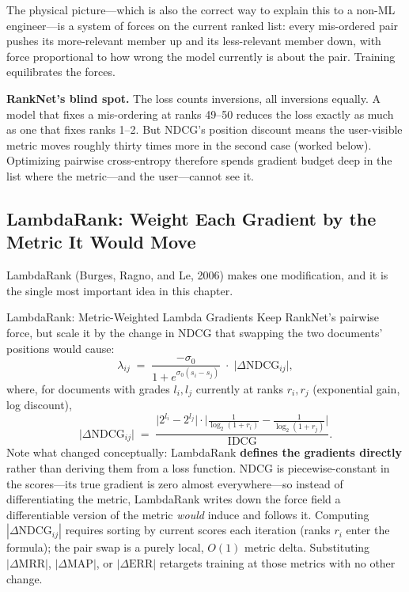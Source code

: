 The physical picture---which is also the correct way to explain this to a non-ML engineer---is a system of forces on the current ranked list: every mis-ordered pair pushes its more-relevant member up and its less-relevant member down, with force proportional to how wrong the model currently is about the pair. Training equilibrates the forces.

\textbf{RankNet's blind spot.} The loss counts inversions, all inversions equally. A model that fixes a mis-ordering at ranks 49--50 reduces the loss exactly as much as one that fixes ranks 1--2. But NDCG's position discount means the user-visible metric moves roughly thirty times more in the second case (worked below). Optimizing pairwise cross-entropy therefore spends gradient budget deep in the list where the metric---and the user---cannot see it.

\subsection{LambdaRank: Weight Each Gradient by the Metric It Would Move}

LambdaRank (Burges, Ragno, and Le, 2006) makes one modification, and it is the single most important idea in this chapter.

\begin{mathresult}{LambdaRank: Metric-Weighted Lambda Gradients}
Keep RankNet's pairwise force, but scale it by the change in NDCG that swapping the two documents' positions would cause:
\begin{equation}
\lambda_{ij} \;=\; \frac{-\sigma_0}{1 + e^{\sigma_0 (s_i - s_j)}}\;\cdot\;\bigl|\Delta \text{NDCG}_{ij}\bigr|,
\end{equation}
where, for documents with grades $l_i, l_j$ currently at ranks $r_i, r_j$ (exponential gain, log discount),
\begin{equation}
\bigl|\Delta \text{NDCG}_{ij}\bigr| \;=\; \frac{\bigl|2^{l_i} - 2^{l_j}\bigr| \cdot \bigl|\tfrac{1}{\log_2(1+r_i)} - \tfrac{1}{\log_2(1+r_j)}\bigr|}{\text{IDCG}}.
\end{equation}
Note what changed conceptually: LambdaRank \textbf{defines the gradients directly} rather than deriving them from a loss function. NDCG is piecewise-constant in the scores---its true gradient is zero almost everywhere---so instead of differentiating the metric, LambdaRank writes down the force field a differentiable version of the metric \textit{would} induce and follows it. Computing $|\Delta\text{NDCG}_{ij}|$ requires sorting by current scores each iteration (ranks $r_i$ enter the formula); the pair swap is a purely local, $O(1)$ metric delta. Substituting $|\Delta\text{MRR}|$, $|\Delta\text{MAP}|$, or $|\Delta\text{ERR}|$ retargets training at those metrics with no other change.
\end{mathresult}

